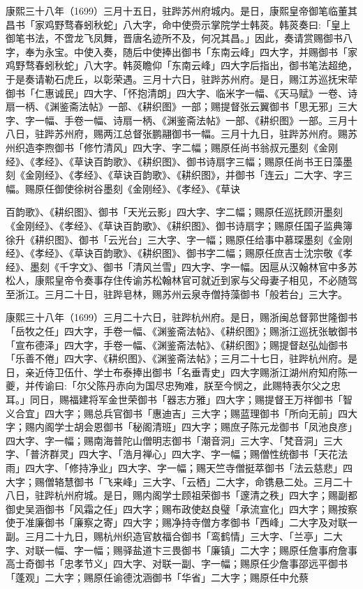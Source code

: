 康熙三十八年（1699）三月十五日，驻跸苏州府城内。是日，康熙皇帝御笔临董其昌书「家鸡野骛春蚓秋蛇」八大字，命中使赍示掌院学士韩菼。韩菼奏曰:「皇上御笔书法，不啻龙飞凤舞，晋唐名迹所不及，何况其昌。」因此，奏请赏赐御书八字，奉为永宝。中使入奏，随后中使捧出御书「东南云峰」四大字，并赐御书「家鸡野骛春蚓秋蛇」八大字。韩菼瞻仰「东南云峰」四大字后指出，御书笔法超绝，于是奏请勒石虎丘，以彰荣遇。三月十六日，驻跸苏州府。是日，赐江苏巡抚宋荦御书「仁惠诚民」四大字、「怀抱清朗」四大字、临米字一幅、《天马赋》一卷、诗扇一柄、《渊鉴斋法帖》一部、《耕织图》一部；赐提督张云翼御书「思无邪」三大字、字一幅、手卷一幅、诗扇一柄、《渊鉴斋法帖》一部、《耕织图》一部。三月十八日，驻跸苏州府，赐两江总督张鹏翮御书一幅。三月十九日，驻跸苏州府。赐苏州织造李煦御书「修竹清风」四大字、字二幅；赐原任尚书翁叔元墨刻《金刚经》、《孝经》、《草诀百韵歌》、《耕织图》、御书诗扇字三幅；赐原任尚书王日藻墨刻《金刚经》、《孝经》、《草诀百韵歌》、《耕织图》，并御书「连云」二大字、字三幅。赐原任御使徐树谷墨刻《金刚经》、《孝经》、《草诀


\noindent 百韵歌》、《耕织图》、御书「天光云影」四大字、字二幅；赐原任巡抚顾汧墨刻《金刚经》、《孝经》、《草诀百韵歌》、《耕织图》、御书诗扇字；赐原任国子监典簿徐升《耕织图》、御书「云光台」三大字、字一幅；赐原任给事中慕琛墨刻《金刚经》、《孝经》、《草诀百韵歌》、《耕织图》、御书字二幅；赐原任庶吉士沈宗敬《孝经》、墨刻《千字文》、御书「清风兰雪」四大字、字一幅。因扈从汉翰林官中多苏松人，康熙皇帝令奏事存住传谕苏松翰林官可就近到家与父母妻子相见，不必随驾至浙江。三月二十日，驻跸皂林，赐苏州云泉寺僧持藻御书「般若台」三大字。

康熙三十八年（1699）三月二十六日，驻跸杭州府。是日，赐浙闽总督郭世隆御书「岳牧之任」四大字，手卷一幅、《渊鉴斋法帖》、《耕织图》；赐浙江巡抚张敏御书「宣布德泽」四大字，手卷一幅、《渊鉴斋法帖》、《耕织图》；赐提督赵弘灿御书「乐善不倦」四大字、《耕织图》、《渊鉴斋法帖》；三月二十七日，驻跸杭州府。是日，亲近侍卫伍什、学士布泰捧出御书「名垂青史」四大字赐浙江湖州府知府陈一夔，并传谕曰:「尔父陈丹赤向为国尽忠殉难，朕至今悯之，此赐特表尔父之忠耳。」同日，赐福建将军金世荣御书「器志方雅」四大字；赐提督王万祥御书「智义合宜」四大字；赐总兵官御书「惠迪吉」三大字；赐蓝理御书「所向无前」四大字；赐内阁学士胡会恩御书「秘阁清班」四大字；赐庶子陈元龙御书「凤池良彦」四大字、字一幅；赐南海普陀山僧明志御书「潮音洞」三大字、「梵音洞」三大字、「普济群灵」四大字、「浩月禅心」四大字、字一幅；赐僧性统御书「天花法雨」四大字、「修持净业」四大字、字一幅；赐天竺寺僧挺萃御书「法云慈悲」四大字；赐僧辂慧御书「飞来峰」三大字、「云栖」二大字，命镌悬二处。三月二十八日，驻跸杭州府城。是日，赐内阁学士顾祖荣御书「邃清之秩」四大字；赐副都御史吴涵御书「风霜之任」四大字；赐布政使赵良璧「承流宣化」四大字；赐按察使于准廉御书「廉察之寄」四大字；赐净持寺僧方孝御书「西峰」二大字及对联一副。三月二十九日，赐杭州织造官敖福合御书「鸾鹤情」三大字、「兰亭」二大字、对联一幅、字一幅；赐驿盐道卞三畏御书「廉镇」二大字；赐原任詹事府詹事高士奇御书「忠孝节义」四大字、对联一副、字一幅；赐原任少詹事邵远平御书「蓬观」二大字；赐原任谕德沈涵御书「华省」二大字；赐原任中允蔡



